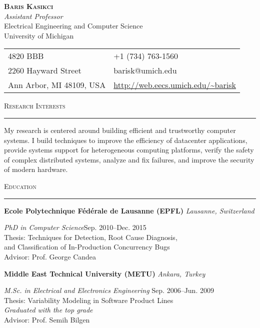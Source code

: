 \documentclass[10pt]{article}
\newcommand{\mysec}[1]{\vspace{2em}\textsc{\large #1}\vspace{1mm}\hrule\vspace{2mm}}
\newcommand{\mysub}[3]{\textbf{#1} {#2} \hfill {\em #3}}
\newcommand{\myssub}[1]{\hspace*{2mm}\parbox{163mm}{#1}\vspace*{2mm}}
\begin{document}
\begin{center}
{\Large \textbf{\textsc{Baris Kasikci}}} \vspace{1mm} \\
{\em  Assistant Professor} \\
Electrical Engineering and Computer Science \\
University of Michigan
\end{center}

\vspace{1em}

\hspace{0.8in}
\begin{tabular}{@{}p{2.5in}p{4in}}
4820 BBB & +1 (734) 763-1560\\
2260 Hayward Street & barisk@umich.edu \\
Ann Arbor, MI 48109, USA & \url{http://web.eecs.umich.edu/~barisk} \\
\end{tabular}

\vspace{1em}

\mysec{Research Interests}

My research is centered around building efficient and trustworthy computer systems. I build techniques to improve the efficiency of datacenter applications, provide systems support for heterogeneous computing platforms, verify the safety of complex distributed systems, analyze and fix failures, and improve the security of modern hardware. 

\mysec{Education}

\mysub{Ecole Polytechnique F\'ed\'erale de Lausanne (EPFL)}{}{Lausanne, Switzerland} \vspace*{1mm} \\
\myssub{\vspace{2mm}\textit{PhD in Computer Science}\hfill Sep. 2010--Dec. 2015 \\
Thesis: Techniques for Detection, Root Cause Diagnosis, \\ \phantom{xxxxxx} and Classification of In-Production Concurrency Bugs \\
Advisor: Prof. George Candea} \vspace{1mm}

\mysub{Middle East Technical University (METU)}{}{Ankara, Turkey} \vspace*{1mm} \\
\myssub{\vspace{2mm}\textit{M.Sc. in Electrical and Electronics Engineering} \hfill Sep. 2006--Jun. 2009 \\
Thesis:  Variability Modeling in Software Product Lines \\
{\textit{Graduated with the top grade}} \\
Advisor: Prof. Semih Bilgen} \vspace*{1mm}
\end{document}
